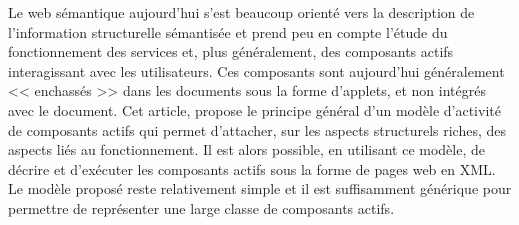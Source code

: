 \documentclass[a4 paper, 10 pt]{article}
\begin{document}
Le web sémantique aujourd'hui s'est beaucoup orienté vers la description de l'information structurelle sémantisée et prend peu en compte l'étude du fonctionnement des services et, plus généralement, des composants actifs interagissant avec les utilisateurs. Ces composants sont aujourd'hui généralement << enchassés >>  dans les documents sous la forme d'applets, et non intégrés avec le document. Cet article, propose le principe général d'un modèle d'activité  de composants actifs qui permet d'attacher, sur les aspects structurels riches, des aspects liés au fonctionnement. Il est alors possible, en utilisant ce modèle, de décrire et d'exécuter les composants actifs sous la forme de pages web en XML. Le modèle proposé reste relativement simple et il est suffisamment générique pour permettre de représenter une large classe de composants actifs.



\cite{W3C}

\cite{livre}




\end{document}
